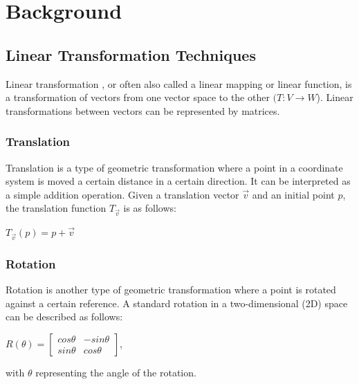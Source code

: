 
\chapter{Background}\label{chapter:background}


\section{Linear Transformation Techniques}

Linear transformation \parencite{linear-trans}, or often also called a linear mapping or linear function, is a transformation of vectors from one vector space to the other \((T: V \rightarrow W\)). Linear transformations between vectors can be represented by matrices.

\subsection{Translation}

Translation \parencite{linear-operation} is a type of geometric transformation where a point in a coordinate system is moved a certain distance in a certain direction. It can be interpreted as a simple addition operation. Given a translation vector \(\Vec{v}\) and an initial point \(p\), the translation function \(T_{\Vec{v}}\) is as follows:

\begin{center}
    \(T_{\Vec{v}}(p) = p + \Vec{v}\) 
\end{center}

\subsection{Rotation}

Rotation is another type of geometric transformation where a point is rotated against a certain reference. A standard rotation in a two-dimensional (2D) space can be described as follows:

\begin{center}
    \(R(\theta) = 
    \begin{bmatrix}
        cos\theta & -sin\theta \\
        sin\theta & cos\theta
    \end{bmatrix}
    \),
\end{center}
with \(\theta\) representing the angle of the rotation.

